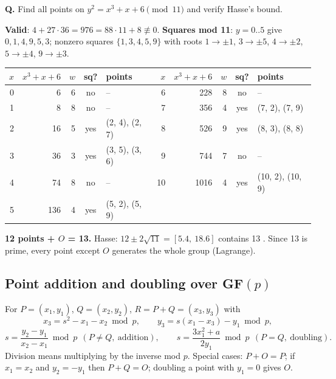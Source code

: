 \begin{worked}
\textbf{Q.} Find all points on $y^2 = x^3 + x + 6 \pmod{11}$ and verify Hasse's bound.

\textbf{Valid}: $4 + 27 \cdot 36 = 976 = 88 \cdot 11 + 8 \not\equiv 0$. \textbf{Squares mod 11}: $y = 0..5$ give $0, 1, 4, 9, 5, 3$; nonzero squares $\{1, 3, 4, 5, 9\}$ with roots $1 \to \pm1$, $3 \to \pm5$, $4 \to \pm2$, $5 \to \pm4$, $9 \to \pm3$.
\begin{center}\small
\begin{tabular}{@{}rrrcl@{\qquad}rrrcl@{}}
\toprule
$x$ & $x^3{+}x{+}6$ & $w$ & sq? & points & $x$ & $x^3{+}x{+}6$ & $w$ & sq? & points\\
\midrule
0 & 6 & 6 & no & -- & 6 & 228 & 8 & no & --\\
1 & 8 & 8 & no & -- & 7 & 356 & 4 & yes & (7, 2), (7, 9)\\
2 & 16 & 5 & yes & (2, 4), (2, 7) & 8 & 526 & 9 & yes & (8, 3), (8, 8)\\
3 & 36 & 3 & yes & (3, 5), (3, 6) & 9 & 744 & 7 & no & --\\
4 & 74 & 8 & no & -- & 10 & 1016 & 4 & yes & (10, 2), (10, 9)\\
5 & 136 & 4 & yes & (5, 2), (5, 9) & & & & & \\
\bottomrule
\end{tabular}
\end{center}
\textbf{12 points + $O$ = 13.} Hasse: $12 \pm 2\sqrt{11} = [5.4,\ 18.6]$ contains 13 \checkmark. Since 13 is prime, every point except $O$ generates the whole group (Lagrange).
\end{worked}

\subsection{Point addition and doubling over GF$(p)$ \new}

\begin{mustknow}
For $P = (x_1, y_1)$, $Q = (x_2, y_2)$, \;$R = P + Q = (x_3, y_3)$ with
\[
x_3 = s^2 - x_1 - x_2 \bmod p, \qquad y_3 = s(x_1 - x_3) - y_1 \bmod p,
\]
\[
s = \frac{y_2 - y_1}{x_2 - x_1} \bmod p \ \ (P \ne Q,\ \text{addition}), \qquad s = \frac{3x_1^2 + a}{2y_1} \bmod p \ \ (P = Q,\ \text{doubling}).
\]
Division means multiplying by the inverse mod $p$. Special cases: $P + O = P$; if $x_1 = x_2$ and $y_2 = -y_1$ then $P + Q = O$; doubling a point with $y_1 = 0$ gives $O$.
\end{mustknow}

